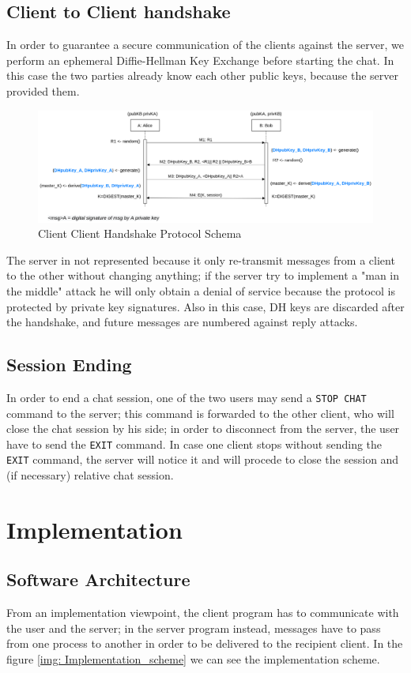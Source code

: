 \documentclass[11pt]{report}
\begin{document}
\section{Client to Client handshake}
In order to guarantee a secure communication of the clients against the server, we perform an ephemeral 
Diffie-Hellman Key Exchange before starting the chat. In this case the two parties already know each other
public keys, because the server provided them. 

\begin{figure}[H]
	\centering
	\includegraphics[scale=0.19]{img/AuthClientClient.png}
	\caption{Client Client Handshake Protocol Schema}
	\label {img: AuthClientClient}
\end{figure}

\noindent The server in not represented because it only re-transmit messages from a client to the other without changing
anything; if the server try to implement a "man in the middle" attack he will only obtain a denial of service
because the protocol is protected by private key signatures. Also in this case, DH keys are discarded after 
the handshake, and future messages are numbered against reply attacks.

\section{Session Ending}
In order to end a chat session, one of the two users may send a \texttt{STOP CHAT} command to the server; this
command is forwarded to the other client, who will close the chat session by his side; in order to disconnect from the server, the user have to send the 
\texttt{EXIT} command. In case one client stops without sending the \texttt{EXIT} command, the server will notice 
it and will procede to close the session and (if necessary) relative chat session.


\chapter{Implementation}
\section{Software Architecture}
From an implementation viewpoint, the client program has to communicate with the user and the server; in the
server program instead, messages have to pass from one process to another in order to be delivered to the
recipient client. In the figure \ref{img: Implementation_scheme} we can see the implementation scheme.
\end{document}
